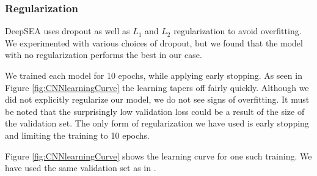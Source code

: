 \documentclass{article}
\begin{document}
\subsubsection{Regularization}
DeepSEA uses dropout as well as $L_1$ and $L_2$ regularization to avoid overfitting. We experimented with various choices of dropout, but we found that the model with no regularization performs the best in our case.

We trained each model for 10 epochs, while applying early stopping.  As seen in Figure \ref{fig:CNNlearningCurve} the learning tapers off fairly quickly. Although we did not explicitly regularize our model, we do not see signs of overfitting. It must be noted that the surprisingly low validation loss could be a result of the size of the validation set. The only form of regularization we have used is early stopping and limiting the training to 10 epochs. 

Figure \ref{fig:CNNlearningCurve} shows the learning curve for one such training. We have used the same validation set as in \cite{zhou2015predicting,quang2016danq}.
\end{document}
